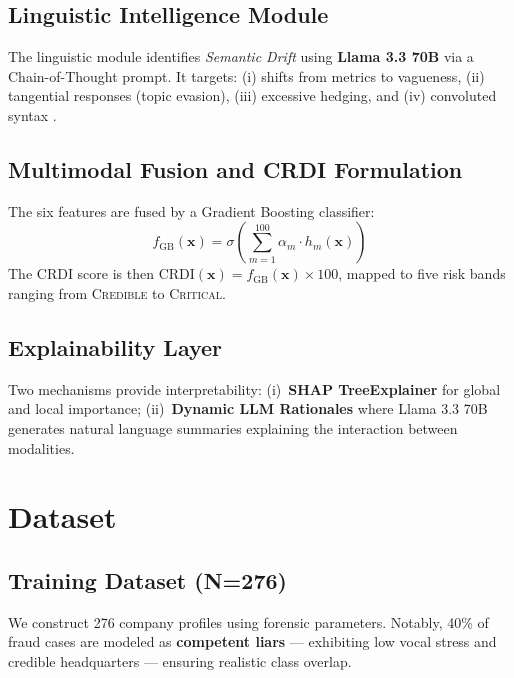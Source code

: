 \documentclass[conference]{IEEEtran}
\begin{document}
\subsection{Linguistic Intelligence Module}

The linguistic module identifies \emph{Semantic Drift} using \textbf{Llama 3.3 70B} 
via a Chain-of-Thought prompt. It targets: (i) shifts from metrics to vagueness, 
(ii) tangential responses (topic evasion), (iii) excessive hedging, and 
(iv) convoluted syntax \cite{humpherys2011}.

\subsection{Multimodal Fusion and CRDI Formulation}

The six features are fused by a Gradient Boosting classifier:
\begin{equation}
  f_{\text{GB}}(\mathbf{x}) = \sigma\!\left(\sum_{m=1}^{100} \alpha_m \cdot h_m(\mathbf{x})\right)
\end{equation}
The CRDI score is then $\text{CRDI}(\mathbf{x}) = f_{\text{GB}}(\mathbf{x}) \times 100$, 
mapped to five risk bands ranging from \textsc{Credible} to \textsc{Critical}.

\subsection{Explainability Layer}

Two mechanisms provide interpretability:
(i)~\textbf{SHAP TreeExplainer} \cite{lundberg2017} for global and local 
importance; (ii)~\textbf{Dynamic LLM Rationales} where Llama 3.3 70B generates 
natural language summaries explaining the interaction between modalities.

\section{Dataset}

\subsection{Training Dataset (N=276)}

We construct 276 company profiles using forensic parameters. Notably, 40\% of 
fraud cases are modeled as \textbf{competent liars} — exhibiting low vocal stress 
and credible headquarters — ensuring realistic class overlap.
\end{document}
